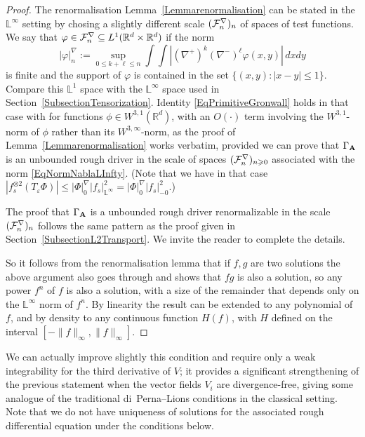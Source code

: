 \documentclass[11pt,a4paper]{amsart}
\newcommand{\RR}{\mathbb{R}}  \newcommand{\CC}{\mathbb{C}}  \newcommand{\LL}{\mathbb{L}}  \newcommand{\WW}{\mathbb{W}}
\renewcommand{\leq}{\leqslant}
\renewcommand{\geq}{\geqslant}
\theoremstyle{plain}%
\theoremstyle{definition}
\theoremstyle{remark}
\numberwithin{equation}{section} %
\begin{document}
\begin{proof}  
The renormalisation Lemma~\ref{Lemmarenormalisation} can be stated in the $\LL^\infty$ setting by chosing a slightly different scale $(\mathcal{F}^\nabla_n)_n$ of spaces of test functions. We say that $\varphi \in \mcF^\nabla_n \subseteq L^1(\RR^d \times \RR^d)$ if the norm
\begin{equation}
\label{EqNormNablaLInfty} 
| \varphi |^\nabla_n := \sup_{0 \leqslant k + \ell \leqslant n} \int \int |(\nabla^+)^k (\nabla^-)^\ell \varphi (x, y) |\,dx dy  
\end{equation}
is finite and the support of $\varphi$ is contained in the set $\{(x,y) : |x-y|\le 1\}$. Compare this $\LL^1$ space  with the $\LL^\infty$ space used in Section~\ref{SubsectionTensorization}. Identity \eqref{EqPrimitiveGronwall} holds in that case with for functions $\phi\in W^{3,1}(\RR^d)$, with an $O(\cdot)$ term involving the $W^{3,1}$-norm of $\phi$ rather than its $W^{3,\infty}$-norm, as the proof of Lemma~\ref{Lemmarenormalisation} works verbatim, provided we can prove that $\Gamma_{\bf A}$ is an unbounded rough driver in the scale of spaces $(\mcF_n^\nabla)_{n\geq 0}$ associated with the norm \eqref{EqNormNablaLInfty}.  (Note that we have in that case $| f_s^{\otimes 2}(T_\varepsilon \Phi)| \leq |\Phi|_0^\nabla | f_s|_{\LL^\infty}^2 = |\Phi|_0^\nabla | f_s|_{-0}^2$.)

\medskip

The proof that $\Gamma_{\bf A}$ is a unbounded rough driver renormalizable in the scale $(\mathcal{F}^\nabla_n)_n$ follows the same pattern as the proof given in Section~\ref{SubsectionL2Transport}. We invite the reader to complete the details.

\smallskip

So it follows from the renormalisation lemma that if $f, g$ are two solutions the above argument also goes through and shows that $fg$ is also a solution, so any power $f^n$ of $f$ is also a solution, with a size of the remainder that depends only on the $\LL^{\infty}$ norm of $f^n$. By linearity the result can be extended to any polynomial of $f$, and by density to any continuous function $H (f)$, with $H$ defined on the interval $[- \| f \|_{\infty}, \| f \|_{\infty}]$. 
\end{proof}
 
\medskip

We can actually improve slightly this condition and require only a weak integrability for the third derivative of $V$; it provides a significant strengthening of the previous statement when the vector fields $V_i$ are divergence-free, giving some analogue of the traditional di~Perna--Lions conditions in the classical setting. Note that we do not have uniqueness of solutions for the associated rough differential equation under the conditions below.
\end{document}
